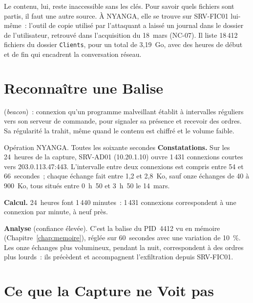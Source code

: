 Le contenu, lui, reste inaccessible sans les clés. Pour savoir quels
fichiers sont partis, il faut une autre source. À NYANGA, elle se trouve sur
SRV-FIC01 lui-même~: l'outil de copie utilisé par l'attaquant a laissé un
journal dans le dossier de l'utilisateur, retrouvé dans l'acquisition du
18~mars (NC-07). Il liste 18\,412 fichiers du dossier \texttt{Clients},
pour un total de 3,19~Go, avec des heures de début et de fin qui encadrent
la conversation réseau.

\section{Reconnaître une Balise}
\label{sec:c06-balise}

\begin{boxdef}
\textbf{} (\textit{beacon})~: connexion qu'un programme
malveillant établit à intervalles réguliers vers son serveur de commande,
pour signaler sa présence et recevoir des ordres. Sa régularité la trahit,
même quand le contenu est chiffré et le volume faible.
\end{boxdef}

\begin{boxscenario}{Opération NYANGA. Toutes les soixante secondes}
\textbf{Constatations.} Sur les 24~heures de la capture, SRV-AD01
(10.20.1.10) ouvre 1\,431 connexions courtes vers 203.0.113.47:443.
L'intervalle entre deux connexions est compris entre 54 et 66~secondes~;
chaque échange fait entre 1,2 et 2,8~Ko, sauf onze échanges de 40 à
900~Ko, tous situés entre 0~h~50 et 3~h~50 le 14~mars.

\textbf{Calcul.} 24~heures font 1\,440 minutes~: 1\,431 connexions
correspondent à une connexion par minute, à neuf près.

\textbf{Analyse} (confiance élevée). C'est la balise du PID~4412 vu en
mémoire (Chapitre~\ref{chap:memoire}), réglée sur 60~secondes avec une
variation de 10~\%. Les onze échanges plus volumineux, pendant la nuit,
correspondent à des ordres plus lourds~: ils précèdent et accompagnent
l'exfiltration depuis SRV-FIC01.
\end{boxscenario}

\section{Ce que la Capture ne Voit pas}
\label{sec:c06-absence}


